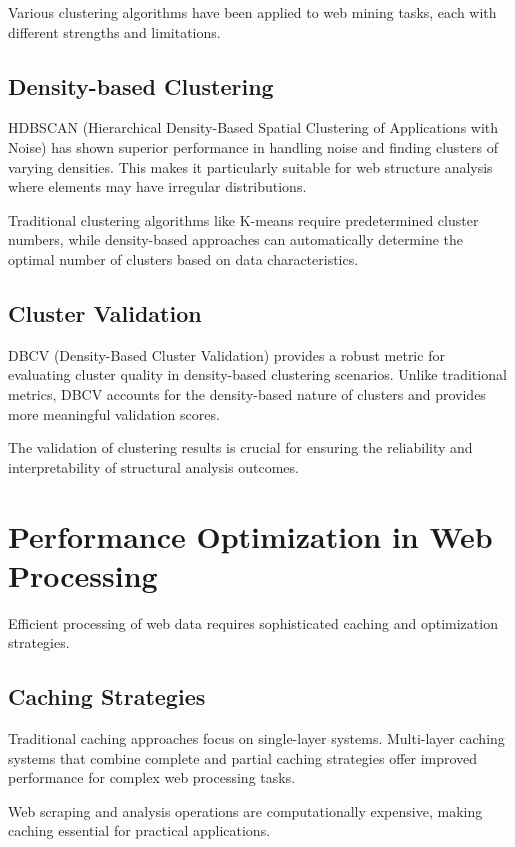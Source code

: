 Various clustering algorithms have been applied to web mining tasks, each with different strengths and limitations.

\subsection{Density-based Clustering}

HDBSCAN (Hierarchical Density-Based Spatial Clustering of Applications with Noise) has shown superior performance in handling noise and finding clusters of varying densities. This makes it particularly suitable for web structure analysis where elements may have irregular distributions.

Traditional clustering algorithms like K-means require predetermined cluster numbers, while density-based approaches can automatically determine the optimal number of clusters based on data characteristics.

\subsection{Cluster Validation}

DBCV (Density-Based Cluster Validation) provides a robust metric for evaluating cluster quality in density-based clustering scenarios. Unlike traditional metrics, DBCV accounts for the density-based nature of clusters and provides more meaningful validation scores.

The validation of clustering results is crucial for ensuring the reliability and interpretability of structural analysis outcomes.

\section{Performance Optimization in Web Processing}
\label{sec:performance_optimization}

Efficient processing of web data requires sophisticated caching and optimization strategies.

\subsection{Caching Strategies}

Traditional caching approaches focus on single-layer systems. Multi-layer caching systems that combine complete and partial caching strategies offer improved performance for complex web processing tasks.

Web scraping and analysis operations are computationally expensive, making caching essential for practical applications.

